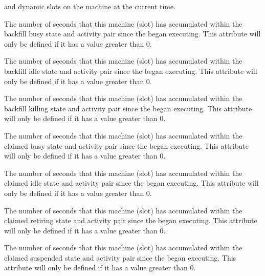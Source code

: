 \begin{description}
and dynamic slots on the machine at the current time.
%
\item[\AdAttr{TotalTimeBackfillBusy}:] The number of seconds
that this machine (slot) has accumulated within the
backfill busy state and activity pair since the 
began executing.
This attribute will only be defined if it has a value greater than 0.
%
\item[\AdAttr{TotalTimeBackfillIdle}:] The number of seconds
that this machine (slot) has accumulated within the
backfill idle state and activity pair since the 
began executing.
This attribute will only be defined if it has a value greater than 0.
%
\item[\AdAttr{TotalTimeBackfillKilling}:] The number of seconds
that this machine (slot) has accumulated within the
backfill killing state and activity pair since the 
began executing.
This attribute will only be defined if it has a value greater than 0.
%
\item[\AdAttr{TotalTimeClaimedBusy}:] The number of seconds
that this machine (slot) has accumulated within the
claimed busy state and activity pair since the 
began executing.
This attribute will only be defined if it has a value greater than 0.
%
\item[\AdAttr{TotalTimeClaimedIdle}:] The number of seconds
that this machine (slot) has accumulated within the
claimed idle state and activity pair since the 
began executing.
This attribute will only be defined if it has a value greater than 0.
%
\item[\AdAttr{TotalTimeClaimedRetiring}:] The number of seconds
that this machine (slot) has accumulated within the
claimed retiring state and activity pair since the 
began executing.
This attribute will only be defined if it has a value greater than 0.
%
\item[\AdAttr{TotalTimeClaimedSuspended}:] The number of seconds
that this machine (slot) has accumulated within the
claimed suspended state and activity pair since the 
began executing.
This attribute will only be defined if it has a value greater than 0.

\end{description}
